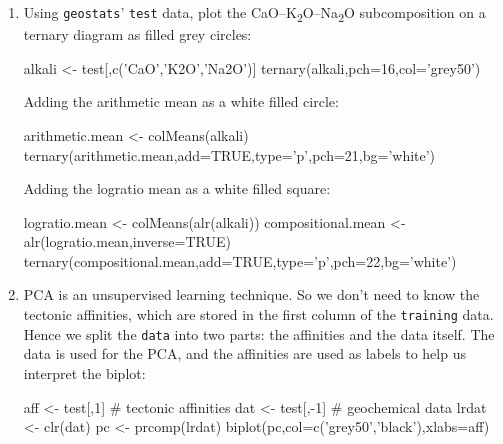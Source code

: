 \begin{enumerate}
\item\label{it:sol-ternary-test} Using \texttt{geostats}'
  \texttt{test} data, plot the
  CaO--K\textsubscript{2}O--Na\textsubscript{2}O subcomposition on a
  ternary diagram as filled grey circles:

\begin{script}
alkali <- test[,c('CaO','K2O','Na2O')]
ternary(alkali,pch=16,col='grey50')
\end{script}

Adding the arithmetic mean as a white filled circle:

\begin{script}[firstnumber=3]
arithmetic.mean <- colMeans(alkali)
ternary(arithmetic.mean,add=TRUE,type='p',pch=21,bg='white')
\end{script}

Adding the logratio mean as a white filled square:

\begin{script}[firstnumber=5]
logratio.mean <- colMeans(alr(alkali))
compositional.mean <- alr(logratio.mean,inverse=TRUE)
ternary(compositional.mean,add=TRUE,type='p',pch=22,bg='white')
\end{script}

\item PCA is an unsupervised learning technique. So we don't need to
  know the tectonic affinities, which are stored in the first column
  of the \texttt{training} data. Hence we split the \texttt{data} into
  two parts: the affinities and the data itself. The data is used for
  the PCA, and the affinities are used as labels to help us interpret
  the biplot:

\begin{script}
aff <- test[,1]      # tectonic affinities
dat <- test[,-1]     # geochemical data
lrdat <- clr(dat)
pc <- prcomp(lrdat)
biplot(pc,col=c('grey50','black'),xlabs=aff)
\end{script}


\end{enumerate}
